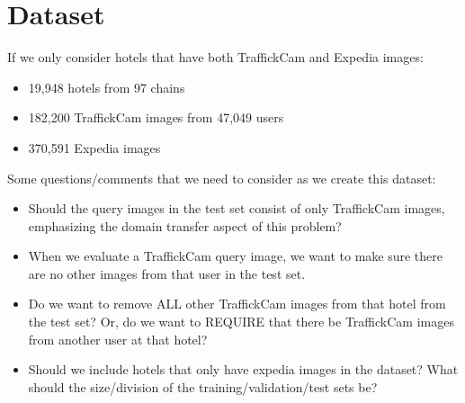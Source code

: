\documentclass[letterpaper]{article} %
\begin{document}
\section{Dataset}

If we only consider hotels that have both TraffickCam and Expedia images:
\begin{itemize}
\item 19,948 hotels from 97 chains
\item 182,200 TraffickCam images from 47,049 users
\item 370,591 Expedia images
\end{itemize}

Some questions/comments that we need to consider as we create this dataset:
\begin{itemize}
\item Should the query images in the test set consist of only TraffickCam images, emphasizing the domain transfer aspect of this problem?
\item When we evaluate a TraffickCam query image, we want to make sure there are no other images from that user in the test set.
\item Do we want to remove ALL other TraffickCam images from that hotel from the test set? Or, do we want to REQUIRE that there be TraffickCam images from another user at that hotel?
\item Should we include hotels that only have expedia images in the dataset?
What should the size/division of the training/validation/test sets be?
\end{itemize}




\end{document}
